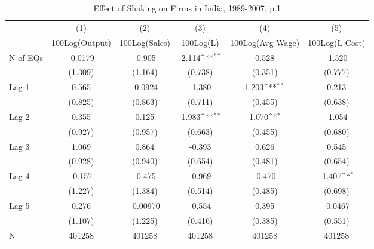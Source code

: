 \begin{table}[htbp]\centering
\def\sym#1{\ifmmode^{#1}\else\(^{#1}\)\fi}
\caption{Effect of Shaking on Firms in India, 1989-2007, p.1}
\begin{tabular}{l*{5}{c}}
\toprule
                &\multicolumn{1}{c}{(1)}&\multicolumn{1}{c}{(2)}&\multicolumn{1}{c}{(3)}&\multicolumn{1}{c}{(4)}&\multicolumn{1}{c}{(5)}\\
                &\multicolumn{1}{c}{100Log(Output)}&\multicolumn{1}{c}{100Log(Sales)}&\multicolumn{1}{c}{100Log(L)}&\multicolumn{1}{c}{100Log(Avg Wage)}&\multicolumn{1}{c}{100Log(L Cost)}\\
\midrule
N of EQs        &  -0.0179         &   -0.905         &   -2.114\sym{**} &    0.528         &   -1.520         \\
                &  (1.309)         &  (1.164)         &  (0.738)         &  (0.351)         &  (0.777)         \\
\addlinespace
Lag 1           &    0.565         &  -0.0924         &   -1.380         &    1.203\sym{**} &    0.213         \\
                &  (0.825)         &  (0.863)         &  (0.711)         &  (0.455)         &  (0.638)         \\
\addlinespace
Lag 2           &    0.355         &    0.125         &   -1.983\sym{**} &    1.070\sym{*}  &   -1.054         \\
                &  (0.927)         &  (0.957)         &  (0.663)         &  (0.455)         &  (0.680)         \\
\addlinespace
Lag 3           &    1.069         &    0.864         &   -0.393         &    0.626         &    0.545         \\
                &  (0.928)         &  (0.940)         &  (0.654)         &  (0.481)         &  (0.654)         \\
\addlinespace
Lag 4           &   -0.157         &   -0.475         &   -0.969         &   -0.470         &   -1.407\sym{*}  \\
                &  (1.227)         &  (1.384)         &  (0.514)         &  (0.485)         &  (0.698)         \\
\addlinespace
Lag 5           &    0.276         & -0.00970         &   -0.554         &    0.395         &  -0.0467         \\
                &  (1.107)         &  (1.225)         &  (0.416)         &  (0.385)         &  (0.551)         \\
\midrule
N               &   401258         &   401258         &   401258         &   401258         &   401258         \\

\end{tabular}
\end{table}
